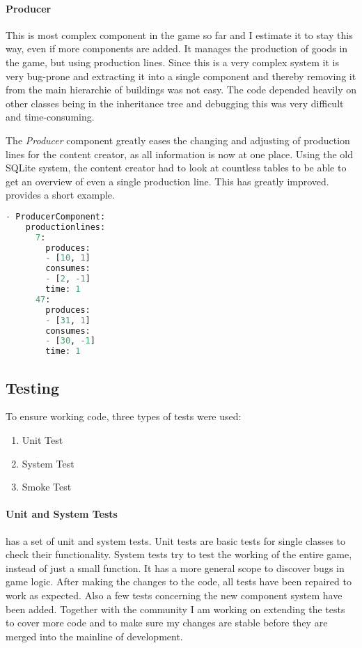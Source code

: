 \paragraph{Producer}
This is most complex component in the game so far and I estimate it to stay this way, even if more components are added.
It manages the production of goods in the game, but using production lines. Since this is a very complex system it is
very bug-prone and extracting it into a single component and thereby removing it from the main hierarchie of buildings
was not easy. The code depended heavily on other classes being in the inheritance tree and debugging this was very
difficult and time-consuming.

The \textit{Producer} component greatly eases the changing and adjusting of production lines for the content creator, as
all information is now at one place. Using the old SQLite system, the content creator had to look at countless tables to
be able to get an overview of even a single production line. This has greatly improved.  provides a short
example.

\begin{lstlisting}[language=python,caption=YAML representation of the Producer with two production lines,
label=produceryaml]
- ProducerComponent:
    productionlines:
      7:
        produces:
        - [10, 1]
        consumes:
        - [2, -1]
        time: 1
      47:
        produces:
        - [31, 1]
        consumes:
        - [30, -1]
        time: 1
\end{lstlisting}

\subsection{Testing}
To ensure working code, three types of tests were used:
\begin{enumerate}
    \item Unit Test
    \item System Test
    \item Smoke Test
\end{enumerate}

\paragraph{Unit and System Tests}
\UH{} has a set of unit and system tests. Unit tests are basic tests for single classes to check their functionality.
System tests try to test the working of the entire game, instead of just a small function. It has a more general scope
to discover bugs in game logic.
After making the changes to the code, all tests have been repaired to work as expected. Also a few tests concerning the
new component system have been added. Together with the community I am working on extending the tests to cover more code
and to make sure my changes are stable before they are merged into the mainline of development.

